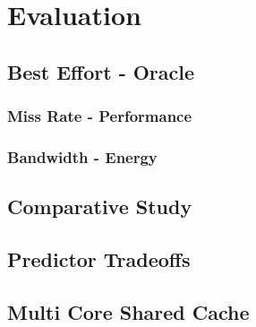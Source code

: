 
%
%

\chapter{Evaluation}
\label{chap:evaluation}

\section{Best Effort - Oracle}
\subsection{Miss Rate - Performance}
\subsection{Bandwidth - Energy}

\section{Comparative Study}

\section{Predictor Tradeoffs}
\label{sec:predictor_tradeoffs}

\section{Multi Core Shared Cache}



